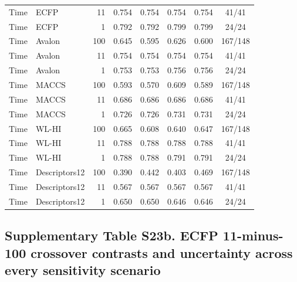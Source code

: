 \begin{longtable}{llrccccc}
Time & ECFP & 11 & 0.754 & 0.754 & 0.754 & 0.754 & 41/41 \\

Time & ECFP & 1 & 0.792 & 0.792 & 0.799 & 0.799 & 24/24 \\

Time & Avalon & 100 & 0.645 & 0.595 & 0.626 & 0.600 & 167/148 \\

Time & Avalon & 11 & 0.754 & 0.754 & 0.754 & 0.754 & 41/41 \\

Time & Avalon & 1 & 0.753 & 0.753 & 0.756 & 0.756 & 24/24 \\

Time & MACCS & 100 & 0.593 & 0.570 & 0.609 & 0.589 & 167/148 \\

Time & MACCS & 11 & 0.686 & 0.686 & 0.686 & 0.686 & 41/41 \\

Time & MACCS & 1 & 0.726 & 0.726 & 0.731 & 0.731 & 24/24 \\

Time & WL-HI & 100 & 0.665 & 0.608 & 0.640 & 0.647 & 167/148 \\

Time & WL-HI & 11 & 0.788 & 0.788 & 0.788 & 0.788 & 41/41 \\

Time & WL-HI & 1 & 0.788 & 0.788 & 0.791 & 0.791 & 24/24 \\

Time & Descriptors12 & 100 & 0.390 & 0.442 & 0.403 & 0.469 & 167/148 \\

Time & Descriptors12 & 11 & 0.567 & 0.567 & 0.567 & 0.567 & 41/41 \\

Time & Descriptors12 & 1 & 0.650 & 0.650 & 0.646 & 0.646 & 24/24 \\

\end{longtable}\endgroup

\subsection*{Supplementary Table S23b. ECFP 11-minus-100 crossover contrasts and uncertainty across every sensitivity scenario}



\begingroup\fontsize{8.5}{10.2}\selectfont\setlength{\tabcolsep}{3.5pt}

